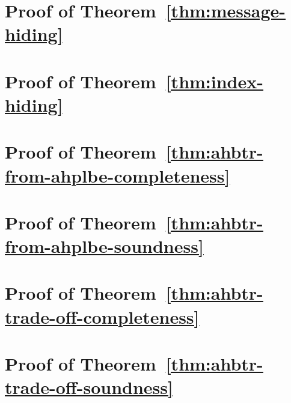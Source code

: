 \section{Proof of Theorem~\ref{thm:message-hiding}}
\label{sec:proof-ahplbe-message-hiding}



\section{Proof of Theorem~\ref{thm:index-hiding}}
\label{sec:proof-ahplbe-index-hiding}



\section{Proof of Theorem~\ref{thm:ahbtr-from-ahplbe-completeness}}
\label{sec:proof-ahbtr-from-ahplbe-completeness}



\section{Proof of Theorem~\ref{thm:ahbtr-from-ahplbe-soundness}}
\label{sec:proof-ahbtr-from-ahplbe-soundness}



\section{Proof of Theorem~\ref{thm:ahbtr-trade-off-completeness}}
\label{sec:proof-ahbtr-trade-off-completeness}



\section{Proof of Theorem~\ref{thm:ahbtr-trade-off-soundness}}
\label{sec:proof-ahbtr-trade-off-soundness}


